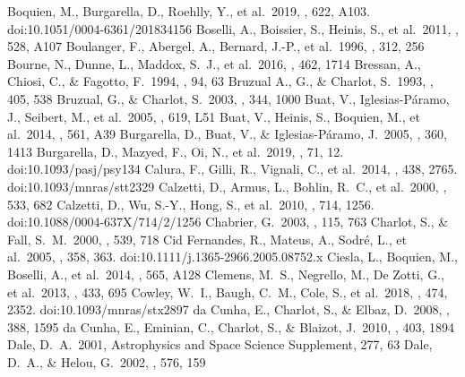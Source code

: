 \documentclass{aa}
\begin{document}
\begin{thebibliography}{}
  Boquien, M., Burgarella, D., Roehlly, Y., et al.\ 2019, \aap, 622, A103. doi:10.1051/0004-6361/201834156
  Boselli, A., Boissier, S., Heinis, S., et al.\ 2011, \aap, 528, A107
  Boulanger, F., Abergel, A., Bernard, J.-P., et al.\ 1996, \aap, 312, 256 
  Bourne, N., Dunne, L., Maddox, S.~J., et al.\ 2016, \mnras, 462, 1714
  Bressan, A., Chiosi, C., \& Fagotto, F.\ 1994, \apjs, 94, 63
  Bruzual A., G., \& Charlot, S.\ 1993, \apj, 405, 538
  Bruzual, G., \& Charlot, S.\ 2003, \mnras, 344, 1000
  Buat, V., Iglesias-P{\'a}ramo, J., Seibert, M., et al.\ 2005, \apjl, 619, L51
  Buat, V., Heinis, S., Boquien, M., et al.\ 2014, \aap, 561, A39 
  Burgarella, D., Buat, V., \& Iglesias-P{\'a}ramo, J.\ 2005, \mnras, 360, 1413 
  Burgarella, D., Mazyed, F., Oi, N., et al.\ 2019, \pasj, 71, 12. doi:10.1093/pasj/psy134
  Calura, F., Gilli, R., Vignali, C., et al.\ 2014, \mnras, 438, 2765. doi:10.1093/mnras/stt2329
  Calzetti, D., Armus, L., Bohlin, R.~C., et al.\ 2000, \apj, 533, 682
  Calzetti, D., Wu, S.-Y., Hong, S., et al.\ 2010, \apj, 714, 1256. doi:10.1088/0004-637X/714/2/1256
  Chabrier, G.\ 2003, \pasp, 115, 763 
  Charlot, S., \& Fall, S.~M.\ 2000, \apj, 539, 718
  Cid Fernandes, R., Mateus, A., Sodr{\'e}, L., et al.\ 2005, \mnras, 358, 363. doi:10.1111/j.1365-2966.2005.08752.x
  Ciesla, L., Boquien, M., Boselli, A., et al.\ 2014, \aap, 565, A128
  Clemens, M.~S., Negrello, M., De Zotti, G., et al.\ 2013, \mnras, 433, 695
  Cowley, W.~I., Baugh, C.~M., Cole, S., et al.\ 2018, \mnras, 474, 2352. doi:10.1093/mnras/stx2897
  da Cunha, E., Charlot, S., \& Elbaz, D.\ 2008, \mnras, 388, 1595
  da Cunha, E., Eminian, C., Charlot, S., \& Blaizot, J.\ 2010, \mnras, 403, 1894 
  Dale, D.~A.\ 2001, Astrophysics and Space Science Supplement, 277, 63
  Dale, D.~A., \& Helou, G.\ 2002, \apj, 576, 159 

\end{thebibliography}
\end{document}
